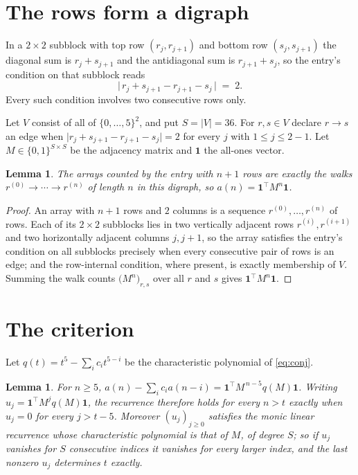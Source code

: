 \documentclass[11pt,a4paper]{article}
\theoremstyle{plain}
\newtheorem{lemma}[theorem]{Lemma}
\theoremstyle{definition}
\begin{document}
\section{The rows form a digraph}

In a $2\times2$ subblock with top row $(r_j,r_{j+1})$ and bottom row $(s_j,s_{j+1})$ the
diagonal sum is $r_j+s_{j+1}$ and the antidiagonal sum is $r_{j+1}+s_j$, so the entry's
condition on that subblock reads
\[
\bigl|\,r_j+s_{j+1}-r_{j+1}-s_j\,\bigr|\;=\;2.
\]
Every such condition involves two consecutive rows only.

Let $V$ consist of all of $\{0,\dots,5\}^{2}$, and put $S=|V|=36$. For $r,s\in V$ declare $r\to s$ an edge
when $\bigl|r_j+s_{j+1}-r_{j+1}-s_j\bigr|=2$ for every $j$ with
$1\le j\le2-1$. Let $M\in\{0,1\}^{S\times S}$ be the adjacency matrix and $\mathbf{1}$
the all-ones vector.

\begin{lemma}\label{lem:walk}
The arrays counted by the entry with $n+1$ rows are exactly the walks
$r^{(0)}\to\cdots\to r^{(n)}$ of length $n$ in this digraph, so
$a(n)=\mathbf{1}^{\!\top}M^{n}\mathbf{1}$.
\end{lemma}

\begin{proof}
An array with $n+1$ rows and $2$ columns is a sequence $r^{(0)},\dots,r^{(n)}$ of
rows. Each of its $2\times2$ subblocks lies in two vertically adjacent rows
$r^{(i)},r^{(i+1)}$ and two horizontally adjacent columns $j,j+1$, so the array satisfies
the entry's condition on all subblocks precisely when every consecutive pair of rows is an
edge; and the row-internal condition, where present, is exactly membership of $V$. Summing
the walk counts $\bigl(M^{n}\bigr)_{r,s}$ over all $r$ and $s$ gives
$\mathbf{1}^{\!\top}M^{n}\mathbf{1}$.
\end{proof}

\section{The criterion}

Let $q(t)=t^{5}-\sum_i c_i t^{5-i}$ be the characteristic polynomial of
\eqref{eq:conj}.

\begin{lemma}\label{lem:crit}
For $n\ge5$,
$a(n)-\sum_i c_i a(n-i)=\mathbf{1}^{\!\top}M^{\,n-5}q(M)\mathbf{1}$. Writing
$u_j=\mathbf{1}^{\!\top}M^{j}q(M)\mathbf{1}$, the recurrence therefore holds for every
$n>t$ exactly when $u_j=0$ for every $j>t-5$. Moreover $(u_j)_{j\ge0}$ satisfies the
monic linear recurrence whose characteristic polynomial is that of $M$, of degree $S$; so
if $u_j$ vanishes for $S$ consecutive indices it vanishes for every larger index, and the
last nonzero $u_j$ determines $t$ exactly.
\end{lemma}
\end{document}
